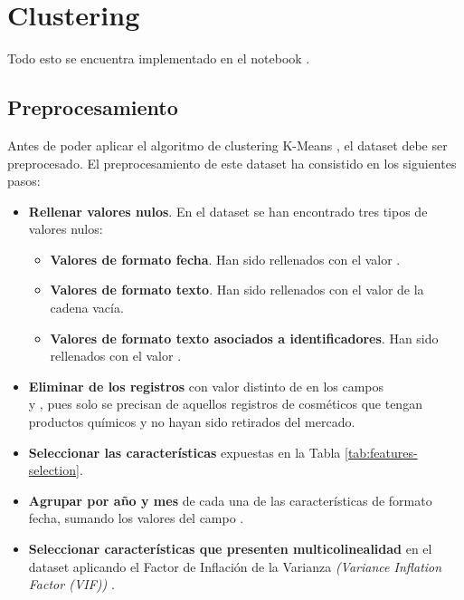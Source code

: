 
\section{Clustering}

Todo esto se encuentra implementado en el notebook  \citep{master}.


\subsection{Preprocesamiento}

Antes de poder aplicar el algoritmo de clustering K-Means \citep{scikit-learn}, el dataset debe ser preprocesado. El preprocesamiento de este dataset ha consistido en los siguientes pasos:

\begin{itemize}
 \item \textbf{Rellenar valores nulos}. En el dataset se han encontrado tres tipos de valores nulos: 
 \begin{itemize}
  \item \textbf{Valores de formato fecha}. Han sido rellenados con el valor .
  \item \textbf{Valores de formato texto}. Han sido rellenados con el valor de la cadena vacía.
  \item \textbf{Valores de formato texto asociados a identificadores}. Han sido rellenados con el valor .
 \end{itemize}
 
 \item \textbf{Eliminar de los registros} con valor distinto de  en los campos \\  y , pues solo se precisan de aquellos registros de cosméticos que tengan productos químicos y no hayan sido retirados del mercado.

 \item \textbf{Seleccionar las características} expuestas en la Tabla \ref{tab:features-selection}.
 \item \textbf{Agrupar por año y mes} de cada una de las características de formato fecha, sumando los valores del campo .
 \item \textbf{Seleccionar características que presenten multicolinealidad} en el dataset aplicando el Factor de Inflación de la Varianza \textit{(Variance Inflation Factor (VIF))} \citep{vif}.
\end{itemize}

